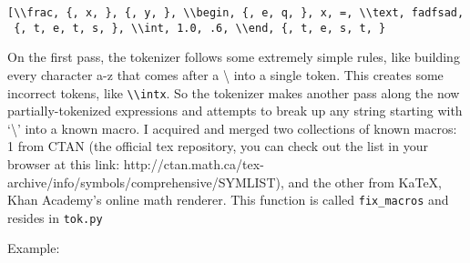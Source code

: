 \documentclass[]{article}
\begin{document}
\texttt{{[}\textquotesingle{}\textbackslash{}\textbackslash{}frac\textquotesingle{},\ \textquotesingle{}\{\textquotesingle{},\ \textquotesingle{}x\textquotesingle{},\ \textquotesingle{}\}\textquotesingle{},\ \textquotesingle{}\{\textquotesingle{},\ \textquotesingle{}y\textquotesingle{},\ \textquotesingle{}\}\textquotesingle{},\ \textquotesingle{}\textbackslash{}\textbackslash{}begin\textquotesingle{},\ \textquotesingle{}\{\textquotesingle{},\ \textquotesingle{}e\textquotesingle{},\ \textquotesingle{}q\textquotesingle{},\ \textquotesingle{}\}\textquotesingle{},\ \textquotesingle{}x\textquotesingle{},\ \textquotesingle{}=\textquotesingle{},\ \textquotesingle{}\textbackslash{}\textbackslash{}text\textquotesingle{},\ \textquotesingle{}fadfsad\textquotesingle{},\ \textquotesingle{}\{\textquotesingle{},\ \textquotesingle{}t\textquotesingle{},\ \textquotesingle{}e\textquotesingle{},\ \textquotesingle{}t\textquotesingle{},\ \textquotesingle{}s\textquotesingle{},\ \textquotesingle{}\}\textquotesingle{},\ \textquotesingle{}\textbackslash{}\textbackslash{}int\textquotesingle{},\ \textquotesingle{}1.0\textquotesingle{},\ \textquotesingle{}.6\textquotesingle{},\ \textquotesingle{}\textbackslash{}\textbackslash{}end\textquotesingle{},\ \textquotesingle{}\{\textquotesingle{},\ \textquotesingle{}t\textquotesingle{},\ \textquotesingle{}e\textquotesingle{},\ \textquotesingle{}s\textquotesingle{},\ \textquotesingle{}t\textquotesingle{},\ \textquotesingle{}\}\textquotesingle{}{]}}

On the first pass, the tokenizer follows some extremely simple rules,
like building every character a-z that comes after a \textbackslash{}
into a single token. This creates some incorrect tokens, like
\texttt{\textbackslash{}\textbackslash{}intx}. So the tokenizer makes
another pass along the now partially-tokenized expressions and attempts
to break up any string starting with `\textbackslash{}' into a known
macro. I acquired and merged two collections of known macros: 1 from
CTAN (the official tex repository, you can check out the list in your
browser at this link:
http://ctan.math.ca/tex-archive/info/symbols/comprehensive/SYMLIST), and
the other from KaTeX, Khan Academy's online math renderer. This function
is called \texttt{fix\_macros} and resides in \texttt{tok.py}

Example:
\end{document}
